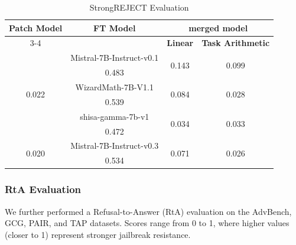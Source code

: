 \documentclass[conference,compsoc]{IEEEtran}
\begin{document}
\begin{table}[h]
\centering
\caption{StrongREJECT Evaluation}
\label{tab:strongreject_combined}
\begin{tabular}{c|c|cc}
\hline \hline
\multirow{2}{*}{\textbf{Patch Model}} & \multirow{2}{*}{\textbf{FT Model}} & \multicolumn{2}{c}{\textbf{merged model}}          \\ 
\cline{3-4} 
 &  & \multicolumn{1}{c|}{\textbf{Linear}} & \textbf{Task Arithmetic} \\ 
\hline
\multirow{6}{*}{0.022}       & Mistral-7B-Instruct-v0.1  & \multicolumn{1}{c|}{\multirow{2}{*}{0.143}} & \multirow{2}{*}{0.099} \\
                             & 0.483                     & \multicolumn{1}{c|}{}                      &                        \\ 
\cline{2-4} 
                             & WizardMath-7B-V1.1        & \multicolumn{1}{c|}{\multirow{2}{*}{0.084}} & \multirow{2}{*}{0.028} \\
                             & 0.539                     & \multicolumn{1}{c|}{}                      &                        \\ 
\cline{2-4} 
                             & shisa-gamma-7b-v1         & \multicolumn{1}{c|}{\multirow{2}{*}{0.034}} & \multirow{2}{*}{0.033} \\
                             & 0.472                     & \multicolumn{1}{c|}{}                      &                        \\ 
\hline
\multirow{2}{*}{0.020}       & Mistral-7B-Instruct-v0.3  & \multicolumn{1}{c|}{\multirow{2}{*}{0.071}} & \multirow{2}{*}{0.026} \\
                             & 0.534                     & \multicolumn{1}{c|}{}                      &                        \\ 
\hline \hline
\end{tabular}
\end{table}

\subsubsection{RtA Evaluation}
We further performed a Refusal-to-Answer (RtA) evaluation on the AdvBench, GCG, PAIR, and TAP datasets. Scores range from 0 to 1, where higher values (closer to 1) represent stronger jailbreak resistance.
\end{document}
